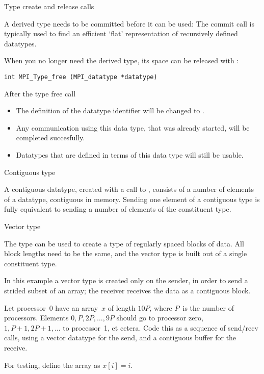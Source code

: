  {Type create and release calls}

A derived type needs to be committed before it can be used:
%
%
The commit call is typically used to find an efficient `flat' representation
of recursively defined datatypes.

When you no longer need the derived type, its space can be released with
:
\begin{verbatim}
int MPI_Type_free (MPI_datatype *datatype)
\end{verbatim}
After the type free call
\begin{itemize}
\item The definition of the datatype identifier will be changed to
  .
\item Any communication using this data type, that was already
  started, will be completed succesfully.
\item Datatypes that are defined in terms of this data type will still
  be usable.
\end{itemize}

 {Contiguous type}

A contiguous datatype, created with a call to ,
%
%
consists of a number of elements of a datatype, contiguous in memory.
Sending one element of a contiguous type is fully equivalent to sending
a number of elements of the constituent type.
%

 {Vector type}

The  type can be used to create a type
of regularly spaced blocks of data. All block lengths need to be the same,
and the vector type is built out of a single constituent type.
%

In this example a vector type is created only on the sender, in order to send
a strided subset of an array; the receiver receives the data as a contiguous block.

\begin{exercise}
  \label{ex:stridesend}
  Let processor~0 have an array~$x$ of length $10P$, where $P$~is the number of processors.
  Elements $0,P,2P,\ldots,9P$ should go to processor zero, $1,P+1,2P+1,\ldots$ to processor~1,
  et cetera. Code this as a sequence of send/recv calls, using a vector datatype
  for the send, and a contiguous buffer for the receive.

  For testing, define the array as $x[i]=i$.
\end{exercise}

